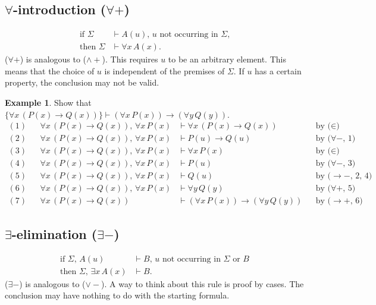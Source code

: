 \documentclass[11pt]{article}
\theoremstyle{definition}
\newtheorem{exmp}[thm]{Example}
\begin{document}
\subsection{$\forall$-introduction ($\forall+$)}
\vspace{-0.25cm}
\begin{align*}
    \text{if } \Sigma &\vdash A(u),\, u \text{ not occurring in $\Sigma$,} \\
    \text{then } \Sigma &\vdash \forall x \, A(x).
\end{align*}
($\forall+$) is analogous to ($\wedge+$). This requires $u$ to be an arbitrary element. This means that the choice of $u$ is independent of the premises of $\Sigma$. If $u$ has a certain property, the conclusion may not be valid.

\begin{exmp}
Show that $\{\forall x\,(P(x) \rightarrow Q(x))\} \vdash (\forall x \, P(x)) \rightarrow (\forall y \, Q(y))$.
\begin{align*}
    (1) & & \forall x\,(P(x) \rightarrow Q(x)),\, \forall x \, P(x) &\vdash \forall x\,(P(x) \rightarrow Q(x)) & & \text{by ($\in$)} \\
    (2) & & \forall x\,(P(x) \rightarrow Q(x)),\, \forall x \, P(x) &\vdash P(u) \rightarrow Q(u) & & \text{by ($\forall-$, 1)} \\
    (3) & & \forall x\,(P(x) \rightarrow Q(x)),\, \forall x \, P(x) &\vdash \forall x \, P(x) & & \text{by ($\in$)} \\
    (4) & & \forall x\,(P(x) \rightarrow Q(x)),\, \forall x \, P(x) &\vdash P(u) & & \text{by ($\forall-$, 3)} \\
    (5) & & \forall x\,(P(x) \rightarrow Q(x)),\, \forall x \, P(x) &\vdash Q(u) & & \text{by ($\rightarrow-$, 2, 4)} \\
    (6) & & \forall x\,(P(x) \rightarrow Q(x)),\, \forall x \, P(x) &\vdash \forall y \, Q(y) & & \text{by ($\forall+$, 5)} \\
    (7) & & \forall x\,(P(x) \rightarrow Q(x)) &\vdash (\forall x \, P(x)) \rightarrow (\forall y \, Q(y)) & & \text{by ($\rightarrow+$, 6)}
\end{align*}
\end{exmp}

\subsection{$\exists$-elimination ($\exists-$)}
\vspace{-0.25cm}
\begin{align*}
    \text{if } \Sigma,\, A(u) &\vdash B,\, u \text{ not occurring in $\Sigma$ or $B$} \\
    \text{then } \Sigma,\, \exists x\,A(x) &\vdash B.
\end{align*}
($\exists-$) is analogous to ($\vee-$). A way to think about this rule is proof by cases. The conclusion may have nothing to do with the starting formula.
\end{document}
